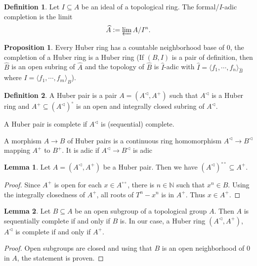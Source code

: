 \documentclass[10pt]{article}
\numberwithin{equation}{section}
\theoremstyle{definition}
\newtheorem{proposition}{Proposition}[subsection]
\newtheorem{definition}{Definition}[subsection]
\newtheorem{lemma}{Lemma}[subsection]
\newcommand{\defeq}{\vcentcolon=}
\newcommand{\N}[0]{\mathbb{N}}
\newcommand{\dcirc}[0]{{\circ\circ}}
\begin{document}
\begin{definition}
    Let $I\subseteq A$ be an ideal of a topological ring. The formal/$I$-adic completion is the limit
    \begin{equation}
        \widehat{A} \defeq \varprojlim A/I^n.
    \end{equation}
\end{definition}

\begin{proposition}
    \label{fact_17_10}
    Every Huber ring has a countable neighborhood base of $0$, the completion of a Huber ring is a Huber ring (If $(B,I)$ is a pair of definition, then $\widehat{B}$ is an open subring of $\widehat{A}$ and the topology of $\widehat{B}$ is $\widehat{I}$-adic with $\widehat{I}=\langle f_1,\cdots,f_n\rangle_{\widehat{B}}$ where $I= \langle f_1,\cdots,f_m\rangle_B$).
\end{proposition}

\begin{definition}
    \label{definition_17_4}
    A Huber pair
    is a pair $A=(A^{\triangleleft},A^+)$ such that $A^{\triangleleft}$ is a Huber ring and $A^+\subseteq (A^{\triangleleft})^\circ$ is an open and integrally closed subring of $A^{\triangleleft}$.
    \par A Huber pair is complete if $A^{\triangleleft}$ is (sequential) complete.
    \par A morphism $A\to B$ of Huber pairs is a continuous ring homomorphism $A^\triangleleft\to B^\triangleleft$ mapping $A^+$ to $B^+$. It is adic if $A^\triangleleft\to B^\triangleleft$ is adic
\end{definition}

\begin{lemma}
    Let $A = (A^\triangleleft, A^+)$ be a Huber pair. Then we have $(A^\triangleleft)^\dcirc\subseteq A^+$.
\end{lemma}
\begin{proof}
    Since $A^+$ is open for each $x\in A^\dcirc$, there is $n\in \N$ such that $x^n\in B$. Using the integrally closedness of $A^+$, all roots of $T^n-x^n$ is in $A^+$. Thus $x\in A^+$.
\end{proof}

\begin{lemma}
    Let $B\subseteq A$ be an open subgroup of a topological group $A$. Then $A$ is sequentially complete if and only if $B$ is. In our case, a Huber ring $(A^\triangleleft,A^+)$, $A^\triangleleft$ is complete if and only if $A^+$.
\end{lemma}
\begin{proof}
Open subgroups are closed and using that $B$ is an open neighborhood of $0$ in $A$, the statement is proven.
\end{proof}
\end{document}
